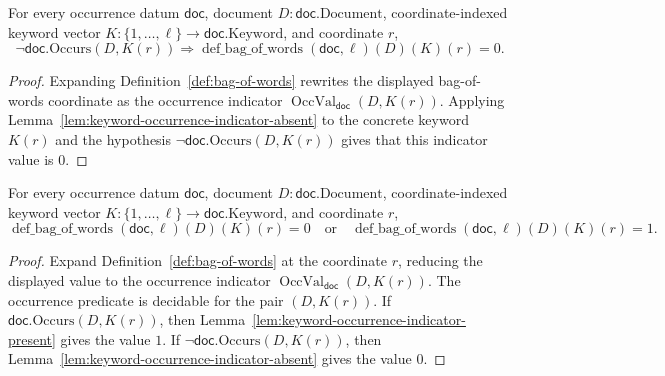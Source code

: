 \begin{lemma}
  \label{lem:bow-coordinate-absent}
  For every occurrence datum $\mathsf{doc}$, document
  $D:\mathsf{doc}.\mathrm{Document}$, coordinate-indexed keyword vector
  $K:\{1,\ldots,\ell\}\to\mathsf{doc}.\mathrm{Keyword}$, and coordinate $r$,
  \[
    \neg\mathsf{doc}.\mathrm{Occurs}(D,K(r))
      \Rightarrow
      \operatorname{def\_bag\_of\_words}(\mathsf{doc},\ell)(D)(K)(r)=0.
  \]
\end{lemma}
\begin{proof}
  Expanding Definition~\ref{def:bag-of-words} rewrites the displayed
  bag-of-words coordinate as the occurrence indicator
  $\operatorname{OccVal}_{\mathsf{doc}}(D,K(r))$.  Applying
  Lemma~\ref{lem:keyword-occurrence-indicator-absent} to the concrete keyword
  $K(r)$ and the hypothesis $\neg\mathsf{doc}.\mathrm{Occurs}(D,K(r))$ gives
  that this indicator value is $0$.
\end{proof}

\begin{lemma}
  \label{lem:bow-coordinate-binary}
  For every occurrence datum $\mathsf{doc}$, document
  $D:\mathsf{doc}.\mathrm{Document}$, coordinate-indexed keyword vector
  $K:\{1,\ldots,\ell\}\to\mathsf{doc}.\mathrm{Keyword}$, and coordinate $r$,
  \[
    \operatorname{def\_bag\_of\_words}(\mathsf{doc},\ell)(D)(K)(r)=0
    \quad\text{or}\quad
    \operatorname{def\_bag\_of\_words}(\mathsf{doc},\ell)(D)(K)(r)=1.
  \]
\end{lemma}
\begin{proof}
  Expand Definition~\ref{def:bag-of-words} at the coordinate $r$, reducing the
  displayed value to the occurrence indicator
  $\operatorname{OccVal}_{\mathsf{doc}}(D,K(r))$.  The occurrence predicate is
  decidable for the pair $(D,K(r))$.  If
  $\mathsf{doc}.\mathrm{Occurs}(D,K(r))$, then
  Lemma~\ref{lem:keyword-occurrence-indicator-present} gives the value $1$.  If
  $\neg\mathsf{doc}.\mathrm{Occurs}(D,K(r))$, then
  Lemma~\ref{lem:keyword-occurrence-indicator-absent} gives the value $0$.
\end{proof}

